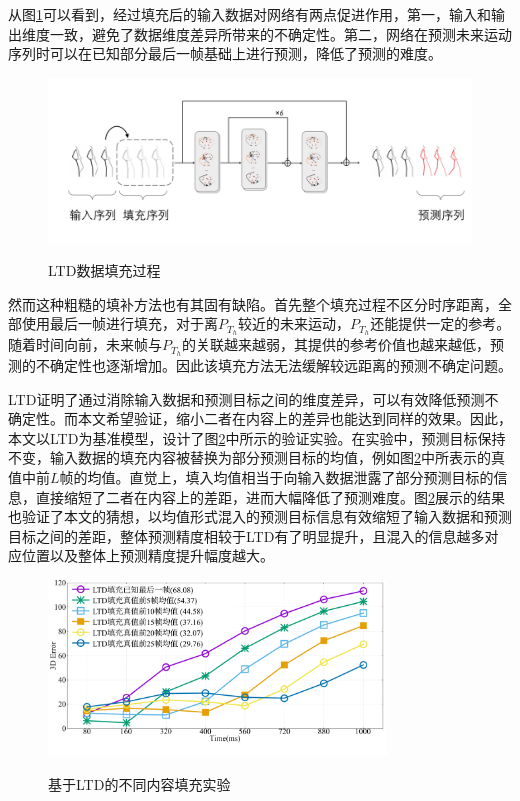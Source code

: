 从图\ref{fig:LTD_padding}可以看到，经过填充后的输入数据对网络有两点促进作用，第一，输入和输出维度一致，避免了数据维度差异所带来的不确定性。第二，网络在预测未来运动序列时可以在已知部分最后一帧基础上进行预测，降低了预测的难度。
\begin{figure}[ht]
    \centering
    \includegraphics[width=1\textwidth]{FigMa/LTD_padding.png}\\
    \vspace{-0.3cm}
    \caption{LTD数据填充过程}
    \label{fig:LTD_padding}
\end{figure}
然而这种粗糙的填补方法也有其固有缺陷。首先整个填充过程不区分时序距离，全部使用最后一帧进行填充，对于离$P_{T_h}$较近的未来运动，$P_{T_h}$还能提供一定的参考。随着时间向前，未来帧与$P_{T_h}$的关联越来越弱，其提供的参考价值也越来越低，预测的不确定性也逐渐增加。因此该填充方法无法缓解较远距离的预测不确定问题。

LTD证明了通过消除输入数据和预测目标之间的维度差异，可以有效降低预测不确定性。而本文希望验证，缩小二者在内容上的差异也能达到同样的效果。因此，本文以LTD为基准模型，设计了图\ref{fig:toy_experiment}中所示的验证实验。在实验中，预测目标保持不变，输入数据的填充内容被替换为部分预测目标的均值，例如图\ref{fig:toy_experiment}中所表示的真值中前$L$帧的均值。直觉上，填入均值相当于向输入数据泄露了部分预测目标的信息，直接缩短了二者在内容上的差距，进而大幅降低了预测难度。图\ref{fig:toy_experiment}展示的结果也验证了本文的猜想，以均值形式混入的预测目标信息有效缩短了输入数据和预测目标之间的差距，整体预测精度相较于LTD有了明显提升，且混入的信息越多对应位置以及整体上预测精度提升幅度越大。

\begin{figure}[h]
    \centering
    \includegraphics[width=0.8\textwidth]{FigMa/padding_chinese.pdf}\\
    \vspace{-0.3cm}
    \caption{基于LTD的不同内容填充实验}
    \label{fig:toy_experiment}
\end{figure}

